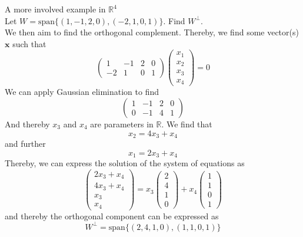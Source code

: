 \documentclass[journal, letterpaper]{IEEEtran}
\begin{document}
    \begin{myboxg}{A more involved example in $\mathbb{R}^4$} \\ 
        Let $W = \text{span}\{(1, -1, 2, 0), (-2, 1, 0, 1) \}$. Find $W^\perp$.
        \newline \\ 
        We then aim to find the orthogonal complement. Thereby, we find some vector(s) $\mathbf{x}$ such that
        $$ \begin{pmatrix}
            1 & -1 & 2 & 0 \\ -2 & 1 & 0 & 1
        \end{pmatrix} \begin{pmatrix}
            x_1 \\ x_2 \\ x_3 \\ x_4
        \end{pmatrix} = 0$$
        We can apply Gaussian elimination to find
        $$ \begin{pmatrix}
            1 & -1 & 2 & 0 \\
            0 & -1 & 4 & 1
        \end{pmatrix}$$
        And thereby $x_3$ and $x_4$ are parameters in $\mathbb{R}$. We find that
        $$ x_2 = 4x_3 + x_4$$
        and further
        $$ x_1 = 2x_3 + x_4$$
        Thereby, we can express the solution of the system of equations as
        $$ \begin{pmatrix}
            2x_3 + x_4 \\ 4x_3 + x_4 \\ x_3 \\ x_4
        \end{pmatrix} = x_3\begin{pmatrix}
            2 \\ 4 \\ 1 \\ 0
        \end{pmatrix} + x_4 \begin{pmatrix}
            1 \\ 1 \\ 0 \\ 1
        \end{pmatrix}$$
        and thereby the orthogonal component can be expressed as
        $$ W^\perp = \text{span}\{(2, 4, 1, 0), (1, 1, 0, 1)\}$$
    \end{myboxg}
\end{document}
